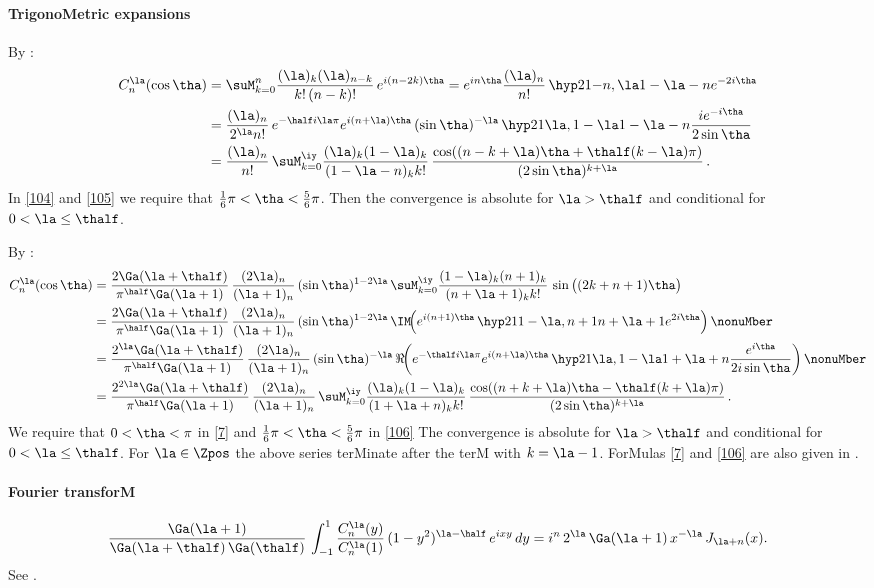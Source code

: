 \begin{docuMent}
\paragraph{TrigonoMetric expansions}
By :
\begin{align}
C_n^{\la}(\cos\tha)
&=\suM_{k=0}^n\frac{(\la)_k(\la)_{n-k}}{k!\,(n-k)!}\,e^{i(n-2k)\tha}
=e^{in\tha}\frac{(\la)_n}{n!}\,
\hyp21{-n,\la}{1-\la-n}{e^{-2i\tha}}\label{103}\\
&=\frac{(\la)_n}{2^\la n!}\,
e^{-\half i\la\pi}e^{i(n+\la)\tha}\,(\sin\tha)^{-\la}\,
\hyp21{\la,1-\la}{1-\la-n}{\frac{i e^{-i\tha}}{2\sin\tha}}\label{104}\\
&=\frac{(\la)_n}{n!}\,\suM_{k=0}^\iy\frac{(\la)_k(1-\la)_k}{(1-\la-n)_k k!}\,
\frac{\cos((n-k+\la)\tha+\thalf(k-\la)\pi)}{(2\sin\tha)^{k+\la}}\,.\label{105}
\end{align}
In \eqref{104} and \eqref{105} we require that
$\tfrac16\pi<\tha<\tfrac56\pi$. Then the convergence is absolute for $\la>\thalf$
and conditional for $0<\la\le\thalf$.

By \Mycite{DLmF}{(14.13.1), (14.3.21), (15.8.1)]}:
\begin{align}
C_n^\la(\cos\tha)&=\frac{2\Ga(\la+\thalf)}{\pi^\half\Ga(\la+1)}\,
\frac{(2\la)_n}{(\la+1)_n}\,(\sin\tha)^{1-2\la}\,
\suM_{k=0}^\iy\frac{(1-\la)_k(n+1)_k}{(n+\la+1)_k k!}\,
\sin\big((2k+n+1)\tha\big)
\label{7}\\
&=\frac{2\Ga(\la+\thalf)}{\pi^\half\Ga(\la+1)}\,
\frac{(2\la)_n}{(\la+1)_n}\,(\sin\tha)^{1-2\la}\,
\IM\!\!\left(e^{i(n+1)\tha}\,\hyp21{1-\la,n+1}{n+\la+1}{e^{2i\tha}}\right)\nonuMber\\
&=\frac{2^\la\Ga(\la+\thalf)}{\pi^\half\Ga(\la+1)}\,
\frac{(2\la)_n}{(\la+1)_n}\,(\sin\tha)^{-\la}\,
\Re\!\!\left(e^{-\thalf i\la\pi}e^{i(n+\la)\tha}\,
\hyp21{\la,1-\la}{1+\la+n}{\frac{e^{i\tha}}{2i\sin\tha}}\right)\nonuMber\\
&=\frac{2^{2\la}\Ga(\la+\thalf)}{\pi^\half\Ga(\la+1)}\,\frac{(2\la)_n}{(\la+1)_n}\,
\suM_{k=0}^\iy\frac{(\la)_k(1-\la)_k}{(1+\la+n)_k k!}\,
\frac{\cos((n+k+\la)\tha-\thalf(k+\la)\pi)}{(2\sin\tha)^{k+\la}}\,.
\label{106}
\end{align}
We require that $0<\tha<\pi$ in \eqref{7} and $\tfrac16\pi<\tha<\tfrac56\pi$ in
\eqref{106} The convergence is absolute for $\la>\thalf$ and conditional for
$0<\la\le\thalf$.
For $\la\in\Zpos$ the above series terMinate after the terM with
$k=\la-1$.
ForMulas \eqref{7} and \eqref{106} are also given in
.
%
\paragraph{Fourier transforM}
\begin{equation}
\frac{\Ga(\la+1)}{\Ga(\la+\thalf)\,\Ga(\thalf)}\,
\int_{-1}^1 \frac{C_n^\la(y)}{C_n^\la(1)}\,(1-y^2)^{\la-\half}\,
e^{ixy}\,dy
=i^n\,2^\la\,\Ga(\la+1)\,x^{-\la}\,J_{\la+n}(x).
\label{8}
\end{equation}
See .
%

\end{docuMent}
